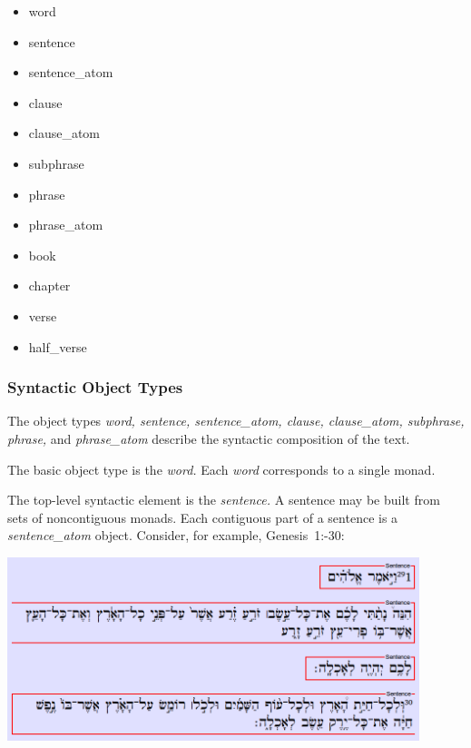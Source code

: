 \documentclass[11pt,oneside,a4paper]{memoir}
\newcommand*{\bibleref}[3]{#1~#2\thinspace:\thinspace#3}
\begin{document}
\begin{itemize}
\item word
\item sentence
\item sentence\_atom
\item clause
\item clause\_atom
\item subphrase
\item phrase
\item phrase\_atom
\item book
\item chapter
\item verse
\item half\_verse
\end{itemize}

\subsubsection{Syntactic Object Types}

The object types \emph{word, sentence, sentence\_atom, clause, clause\_atom, subphrase, phrase,} and
\emph{phrase\_atom} describe the syntactic composition of the text.


The basic object type is the \emph{word.} Each \emph{word} corresponds to a single
monad.

The top-level syntactic element is the \emph{sentence.} A sentence may be built from
sets of noncontiguous monads. Each contiguous part of a sentence is a
\emph{sentence\_atom} object. Consider, for example,
\bibleref{Genesis}{1}{29-30}:

\begin{center}
  \includegraphics[width=0.9\textwidth]{gen1_29-30.png}
\end{center}
\end{document}
